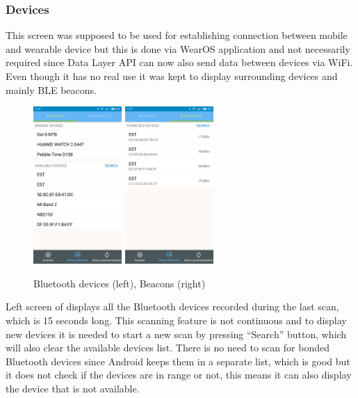 \subsubsection{Devices}\label{subsec:Devices}
This screen was supposed to be used for establishing connection between mobile and wearable device but this is done via WearOS application and not necessarily required since Data Layer API can now also send data between devices via WiFi. Even though it has no real use it was kept to display surrounding devices and mainly BLE beacons.

\begin{figure}[h!]
	\begin{centering}
		\includegraphics[width=0.30\textwidth]{img/devices_bl}
		\hspace{0.2cm}
		\includegraphics[width=0.30\textwidth]{img/devices_ble}
		\par\end{centering}
	\caption{Bluetooth devices (left), Beacons (right)\label{fig:bl_ble_list}}
	\label{fig07c05}
\end{figure}

Left screen of  displays all the Bluetooth devices recorded during the last scan, which is 15 seconds long. This scanning feature is not continuous and to display new devices it is needed to start a new scan by pressing \enquote{Search} button, which will also clear the available devices list. There is no need to scan for bonded Bluetooth devices since Android keeps them in a separate list, which is good but it does not check if the devices are in range or not, this means it can also display the device that is not available.

